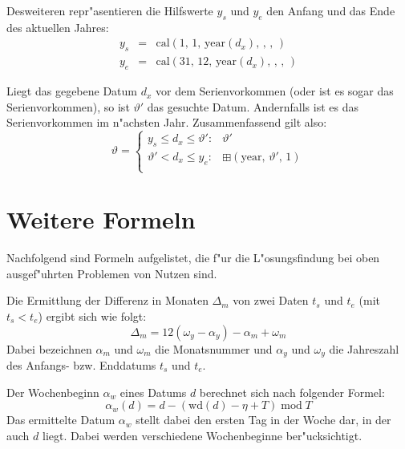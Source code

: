 \documentclass[a4paper]{article}
\newcommand*{\yearf}{\mathrm{year}}
\newcommand*{\wdf}{\mathrm{wd}}
\newcommand*{\calf}{\mathrm{cal}}
\newcommand*{\addff}{\boxplus}
\renewcommand{\mod}{\;\mathrm{mod}\;}
\numberwithin{equation}{section}
\begin{document}
Desweiteren repr"asentieren die Hilfswerte $y_s$ und $y_e$ den Anfang und das
Ende des aktuellen Jahres:
\begin{eqnarray}
  y_s & = & \calf(1,\,1,\,\yearf(d_x),\,,\,,\,) \\
  y_e & = & \calf(31,\,12,\,\yearf(d_x),\,,\,,\,)
\end{eqnarray}

Liegt das gegebene Datum $d_x$ vor dem Serienvorkommen (oder ist es sogar das
Serienvorkommen), so ist $\vartheta'$ das gesuchte Datum. Andernfalls ist es das
Serienvorkommen im n"achsten Jahr. Zusammenfassend gilt also:
\begin{equation}
  \vartheta = \left\{\begin{array}{ll}
    y_s \le d_x \le \vartheta' : & \vartheta' \\
    \vartheta' < d_x \le y_e : & \addff(\yearf,\,\vartheta',\,1) \\
    \end{array}\right.
\end{equation}



%
%
%
%
\section{Weitere Formeln}
Nachfolgend sind Formeln aufgelistet, die f"ur die L"osungsfindung bei oben
ausgef"uhrten Problemen von Nutzen sind.

Die Ermittlung der Differenz in Monaten $\Delta_m$ von zwei Daten $t_s$ und
$t_e$ (mit $t_s < t_e$) ergibt sich wie folgt:
\begin{equation}\label{eqn:monthDiff}
  \Delta_m = 12(\omega_y - \alpha_y) - \alpha_m + \omega_m
\end{equation}
Dabei bezeichnen $\alpha_m$ und $\omega_m$ die Monatsnummer und $\alpha_y$ und
$\omega_y$ die Jahreszahl des Anfangs- bzw. Enddatums $t_s$ und $t_e$.

Der Wochenbeginn $\alpha_w$ eines Datums $d$ berechnet sich nach folgender
Formel:
\begin{equation}\alpha_w(d) = d - (\wdf(d) - \eta + T) \mod T\end{equation}
Das ermittelte Datum $\alpha_w$ stellt dabei den ersten Tag in der Woche dar, in
der auch $d$ liegt. Dabei werden verschiedene Wochenbeginne ber"ucksichtigt.
\end{document}
